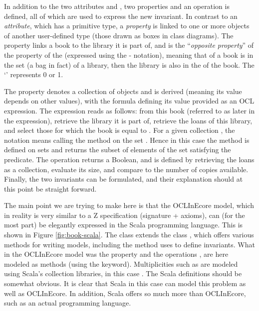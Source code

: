 In addition to the two attributes  and ,
two properties and an operation is defined, all of which are used 
to express the new invariant. In contrast to an {\em attribute}, 
which has a primitive type, a {\em property} is linked to one or 
more objects of another user-defined 
type (those drawn as boxes in class diagrams).
The property  links a book to the library it is part 
of, and is the ``{\em opposite property}'' of the  
property of the  (expressed using the \iocl{#}-
notation), meaning that of a book is in the  set (a bag 
in fact) of a library, then the library is also in the 
 of the book. The `' represents 0 or 1.

The property  denotes a collection of  
objects and is 
derived (meaning its value depends on other values), with the 
formula defining 
its value provided as an OCL expression.
The expression reads as follows: from this book (referred to as 
 later in the expression), retrieve the library it is 
part of, retrieve the 
loans of this library, and select those for which the book is equal 
to . For a given collection , the notation 
means calling the method  on the set . Hence in 
this case the
 method is defined on sets and returns the 
subset of 
elements of the set satisfying the predicate.
The operation  returns a Boolean, and is defined 
by retrieving the loans as a collection, evaluate its size, and 
compare to the 
number of copies available. Finally, the two invariants can be 
formulated, and their explanation should at this point be straight 
forward.

The main point we are trying to make here is that the OCLInEcore model, which in reality is very similar to a Z specification (signature + axioms), can (for the most part) be elegantly expressed in the Scala programming language. This is shown in Figure \ref{fig:book-scala}. The class  extends the
class , which offers various methods for writing models, including the  method uses to define invariants. What in the OCLInEcore model was the property  and the operations , are here modeled as methods (using the  keyword). Multiplicities such as  are modeled using Scala's collection libraries, in this case . The Scala definitions should be somewhat obvious. It is clear that Scala in this case
can model this problem as well as OCLInEcore. In addition, Scala offers so much more than OCLInEcore, such as an actual programming language.

